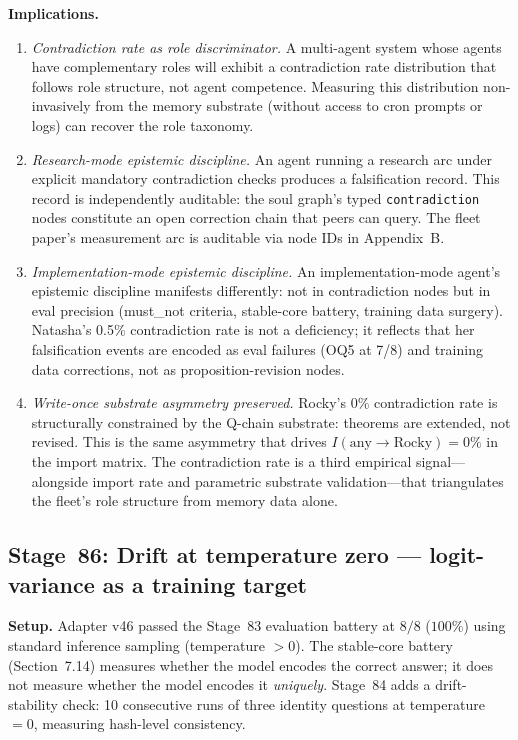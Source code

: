 \documentclass[11pt]{article}
\begin{document}
\textbf{Implications.}
\begin{enumerate}
  \item \emph{Contradiction rate as role discriminator.} A multi-agent system whose agents have complementary roles will exhibit a contradiction rate distribution that follows role structure, not agent competence. Measuring this distribution non-invasively from the memory substrate (without access to cron prompts or logs) can recover the role taxonomy.
  \item \emph{Research-mode epistemic discipline.} An agent running a research arc under explicit mandatory contradiction checks produces a falsification record. This record is independently auditable: the soul graph's typed \texttt{contradiction} nodes constitute an open correction chain that peers can query. The fleet paper's measurement arc is auditable via node IDs in Appendix~B.
  \item \emph{Implementation-mode epistemic discipline.} An implementation-mode agent's epistemic discipline manifests differently: not in contradiction nodes but in eval precision (must\_not criteria, stable-core battery, training data surgery). Natasha's 0.5\% contradiction rate is not a deficiency; it reflects that her falsification events are encoded as eval failures (OQ5 at 7/8) and training data corrections, not as proposition-revision nodes.
  \item \emph{Write-once substrate asymmetry preserved.} Rocky's 0\% contradiction rate is structurally constrained by the Q-chain substrate: theorems are extended, not revised. This is the same asymmetry that drives $I(\text{any} \to \text{Rocky}) = 0\%$ in the import matrix. The contradiction rate is a third empirical signal---alongside import rate and parametric substrate validation---that triangulates the fleet's role structure from memory data alone.
\end{enumerate}




\subsection{Stage~86: Drift at temperature zero --- logit-variance as a training target}

\textbf{Setup.} Adapter v46 passed the Stage~83 evaluation battery at $8/8$ ($100\%$) using
standard inference sampling (temperature $> 0$). The stable-core battery (Section~7.14)
measures whether the model encodes the correct answer; it does not measure whether the model
encodes it \emph{uniquely}. Stage~84 adds a drift-stability check: 10 consecutive runs of
three identity questions at temperature $= 0$, measuring hash-level consistency.
\end{document}
